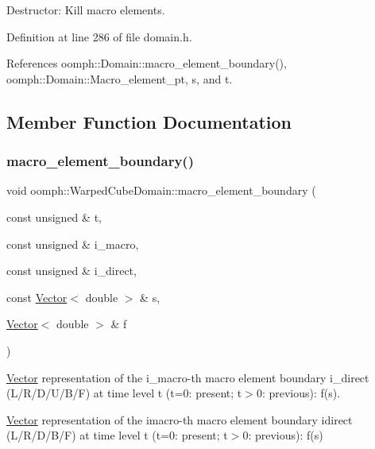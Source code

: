 Destructor\+: Kill macro elements. 



Definition at line 286 of file domain.\+h.



References oomph\+::\+Domain\+::macro\+\_\+element\+\_\+boundary(), oomph\+::\+Domain\+::\+Macro\+\_\+element\+\_\+pt, s, and t.



\subsection{Member Function Documentation}
\mbox{\label{classoomph_1_1WarpedCubeDomain_a4e021719488897307d141fe4df327e49}} 
\subsubsection{\texorpdfstring{macro\+\_\+element\+\_\+boundary()}{macro\_element\_boundary()}}
{\footnotesize\ttfamily void oomph\+::\+Warped\+Cube\+Domain\+::macro\+\_\+element\+\_\+boundary (\begin{DoxyParamCaption}\item[{const unsigned \&}]{t,  }\item[{const unsigned \&}]{i\+\_\+macro,  }\item[{const unsigned \&}]{i\+\_\+direct,  }\item[{const \hyperlink{classoomph_1_1Vector}{Vector}$<$ double $>$ \&}]{s,  }\item[{\hyperlink{classoomph_1_1Vector}{Vector}$<$ double $>$ \&}]{f }\end{DoxyParamCaption})\hspace{0.3cm}{\ttfamily [virtual]}}



\hyperlink{classoomph_1_1Vector}{Vector} representation of the i\+\_\+macro-\/th macro element boundary i\+\_\+direct (L/\+R/\+D/\+U/\+B/F) at time level t (t=0\+: present; t$>$0\+: previous)\+: f(s). 

\hyperlink{classoomph_1_1Vector}{Vector} representation of the imacro-\/th macro element boundary idirect (L/\+R/\+D/\+B/F) at time level t (t=0\+: present; t$>$0\+: previous)\+: f(s) 

